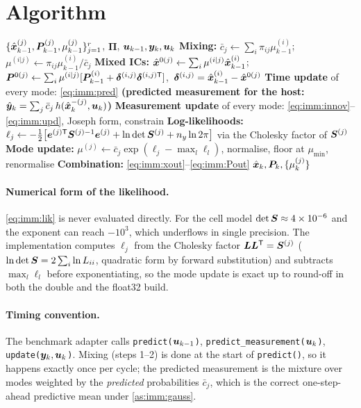 \section{Algorithm}
\begin{algorithm}[H]
\caption{IMM --- one sampling period}
\begin{algorithmic}[1]
\Require $\{\hat{\bm{x}}^{(j)}_{k-1},\bm{P}^{(j)}_{k-1},\mu^{(j)}_{k-1}\}_{j=1}^{r}$, $\bm\Pi$, $\bm{u}_{k-1},\bm{y}_k,\bm{u}_k$
\State \textbf{Mixing:} $\bar c_j\gets\sum_i\pi_{ij}\mu^{(i)}_{k-1}$;\quad $\mu^{(i|j)}\gets\pi_{ij}\mu^{(i)}_{k-1}/\bar c_j$
\State \textbf{Mixed ICs:} $\hat{\bm{x}}^{0(j)}\gets\sum_i\mu^{(i|j)}\hat{\bm{x}}^{(i)}_{k-1}$;\quad
       $\bm{P}^{0(j)}\gets\sum_i\mu^{(i|j)}[\bm{P}^{(i)}_{k-1}+\bm\delta^{(i,j)}\bm\delta^{(i,j)\mathsf{T}}]$,\ $\bm\delta^{(i,j)}=\hat{\bm{x}}^{(i)}_{k-1}-\hat{\bm{x}}^{0(j)}$
\State \textbf{Time update} of every mode: \eqref{eq:imm:pred}
\State \textbf{(predicted measurement for the host: } $\hat{\bm{y}}_k=\sum_j\bar c_j\,h(\hat{\bm{x}}^{-(j)}_k,\bm{u}_k)$\textbf{)}
\State \textbf{Measurement update} of every mode: \eqref{eq:imm:innov}--\eqref{eq:imm:upd}, Joseph form, constrain
\State \textbf{Log-likelihoods:} $\ell_j\gets-\tfrac12\big[\bm{e}^{(j)\mathsf{T}}\bm{S}^{(j)-1}\bm{e}^{(j)}+\ln\det\bm{S}^{(j)}+n_y\ln2\pi\big]$ via the Cholesky factor of $\bm{S}^{(j)}$
\State \textbf{Mode update:} $\mu^{(j)}\gets\bar c_j\exp(\ell_j-\max_l\ell_l)$, normalise, floor at $\mu_{\min}$, renormalise
\State \textbf{Combination:} \eqref{eq:imm:xout}--\eqref{eq:imm:Pout}
\Ensure $\hat{\bm{x}}_k,\bm{P}_k,\{\mu^{(j)}_k\}$
\end{algorithmic}
\end{algorithm}

\paragraph{Numerical form of the likelihood.}  \eqref{eq:imm:lik} is never evaluated directly.  For
the cell model $\det\bm{S}\approx4\times10^{-6}$ and the exponent can reach $-10^3$, which underflows
in single precision.  The implementation computes $\ell_j$ from the Cholesky factor
$\bm{L}\bm{L}^{\mathsf{T}}=\bm{S}^{(j)}$ ($\ln\det\bm{S} = 2\sum_i\ln L_{ii}$, quadratic form by forward substitution) and
subtracts $\max_l\ell_l$ before exponentiating, so the mode update is exact up to round-off in both
the double and the float32 build.

\paragraph{Timing convention.}  The benchmark adapter calls \texttt{predict($\bm{u}_{k-1}$)},
\texttt{predict\_measurement($\bm{u}_k$)}, \texttt{update($\bm{y}_k,\bm{u}_k$)}.  Mixing (steps 1--2) is done
at the start of \texttt{predict()}, so it happens exactly once per cycle; the predicted measurement
is the mixture over modes weighted by the \emph{predicted} probabilities $\bar c_j$, which is the
correct one-step-ahead predictive mean under \cref{as:imm:gauss}.

